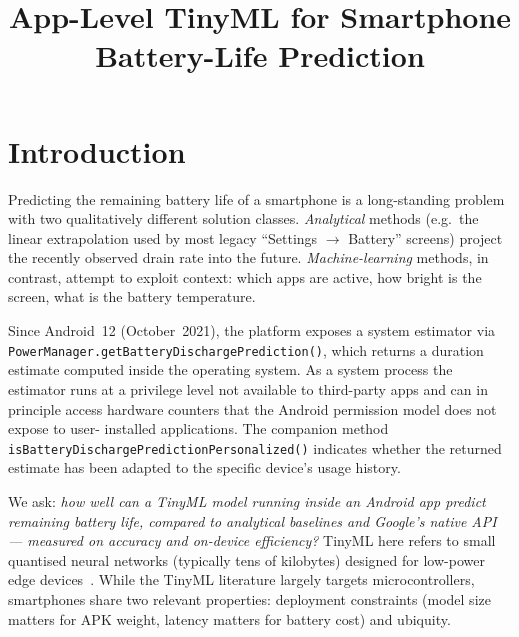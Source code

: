 \documentclass[conference]{IEEEtran}
\begin{document}
\title{App-Level TinyML for Smartphone Battery-Life Prediction}

\author{
}

\maketitle

\section{Introduction}
Predicting the remaining battery life of a smartphone is a long-standing
problem with two qualitatively different solution classes. \emph{Analytical}
methods (e.g.\ the linear extrapolation used by most legacy ``Settings
$\rightarrow$ Battery'' screens) project the recently observed drain rate
into the future. \emph{Machine-learning} methods, in contrast, attempt to
exploit context: which apps are active, how bright is the screen, what is
the battery temperature.

Since Android~12 (October~2021), the platform exposes a system
estimator via
\texttt{PowerManager.\allowbreak getBatteryDischargePrediction()}\cite{android2021powermanager},
which returns a duration estimate computed inside the operating system.
As a system process the estimator runs at a privilege level not
available to third-party apps and can in principle access hardware
counters that the Android permission model does not expose to user-%
installed applications. The companion method
\texttt{isBatteryDischargePredictionPersonalized()} indicates whether
the returned estimate has been adapted to the specific device's usage
history.

We ask: \emph{how well can a TinyML model running inside an
Android app predict remaining battery life, compared to analytical
baselines and Google's native API --- measured on accuracy and
on-device efficiency?} TinyML here refers to small quantised neural
networks (typically tens of kilobytes) designed for low-power edge
devices~\cite{banbury2021mlperf}. While the TinyML literature largely
targets microcontrollers, smartphones share two relevant properties:
deployment constraints (model size matters for APK weight, latency
matters for battery cost) and ubiquity.
\end{document}

